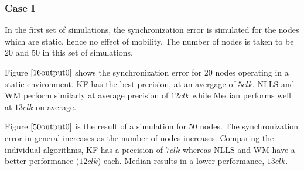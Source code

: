 \documentclass[journal]{IEEEtran}
\begin{document}
\subsubsection{\textbf{Case I}} In the first set of simulations, the synchronization error is simulated for the nodes which are static, hence no effect of mobility. The number of nodes is taken to be $20$ and $50$ in this set of simulations.
\par
Figure $\ref{16output0}$ shows the synchronization error for $20$ nodes operating in a static environment. KF has the best precision, at an avergage of $5clk$. NLLS and WM perform similarly at average precision of $12clk$ while Median performs well at $13clk$ on average.
\par
Figure $\ref{50output0}$ is the result of a simulation for $50$ nodes. The synchronization error in general increases as the number of nodes increases. Comparing the individual algorithms, KF has a precision of $7clk$ whereas NLLS and WM have a better performance ($12clk$) each. Median results in a lower performance, $13clk$.
\end{document}
